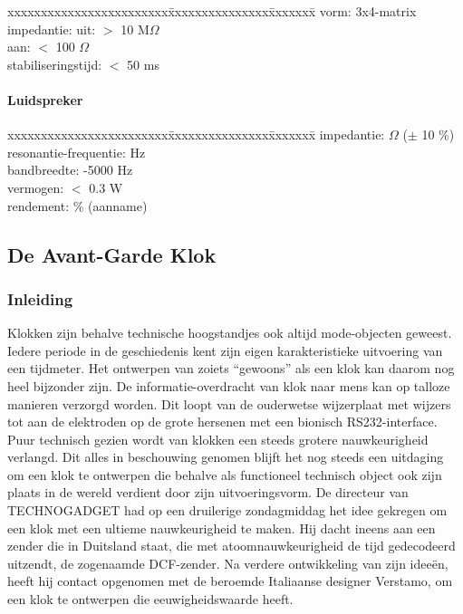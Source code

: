 \begin{tabbing}
xxxxxxxxxxxxxxxxxxxxxxxx\=xxxxxxxxxxxxxxx\=xxxxxxx\=\kill
vorm:			\>3x4-matrix\\
impedantie:		\>uit: 		\>$>$ 10 M$\Omega$\\
			\>aan:		\>$<$ 100 $\Omega$\\
stabiliseringstijd:	\>$<$ 50 ms\\
\end{tabbing}



\paragraph{Luidspreker}

\begin{tabbing}
xxxxxxxxxxxxxxxxxxxxxxxx\=xxxxxxxxxxxxxxx\=xxxxxxx\=\kill
impedantie:		 $\Omega$ ($\pm$ 10 \%)\\
resonantie-frequentie:	 Hz\\
bandbreedte:		-5000 Hz\\
vermogen:		\>$<$ 0.3 W\\
rendement:		 \% (aanname)\\
\end{tabbing}


\subsection{De Avant-Garde Klok}

\subsubsection{Inleiding}
Klokken zijn behalve technische hoogstandjes ook altijd mode-objecten geweest.
Iedere periode in de geschiedenis kent zijn eigen karakteristieke uitvoering van een tijdmeter.
Het ontwerpen van zoiets ``gewoons'' als een klok kan daarom nog heel bijzonder zijn.
De informatie-overdracht van klok naar mens kan op talloze manieren verzorgd worden.
Dit loopt van de ouderwetse wijzerplaat met wijzers tot aan de elektroden op de grote hersenen met een bionisch RS232-interface.
Puur technisch gezien wordt van klokken een steeds grotere nauwkeurigheid verlangd.
Dit alles in beschouwing genomen blijft het nog steeds een uitdaging om een klok te ontwerpen die behalve als functioneel technisch object ook zijn plaats in de wereld verdient door zijn uitvoeringsvorm.
De directeur van TECHNOGADGET had op een druilerige zondagmiddag het idee
gekregen om een klok met een ultieme nauwkeurigheid te maken. Hij dacht 
ineens aan een zender die in Duitsland staat, die met atoomnauwkeurigheid
de tijd gedecodeerd uitzendt, de zogenaamde DCF-zender.
Na verdere ontwikkeling van zijn idee\"en, heeft hij contact opgenomen met
de beroemde Italiaanse designer Verstamo, om 
een klok te ontwerpen die eeuwigheidswaarde heeft.

